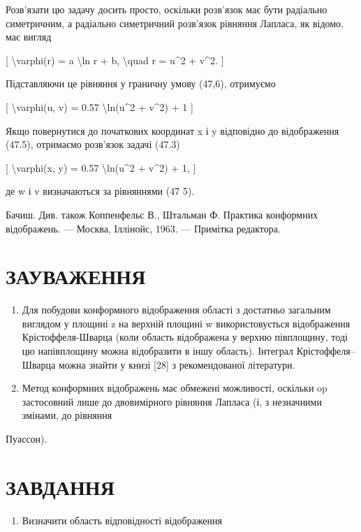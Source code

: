 \documentclass[
]{article}
\providecommand{\tightlist}{%
  \setlength{\itemsep}{0pt}\setlength{\parskip}{0pt}}
\begin{document}
{Розв'язати цю задачу досить просто, оскільки розв'язок має бути
радіально симетричним, а радіально симетричний розв'язок рівняння
Лапласа, як відомо, має вигляд

{[} \textbackslash varphi(r) = a \textbackslash ln r + b,
\textbackslash quad r = u\^{}2 + v\^{}2. {]}

Підставляючи це рівняння у граничну умову (47,6), отримуємо

{[} \textbackslash varphi(u, v) = 0.57 \textbackslash ln(u\^{}2 +
v\^{}2) + 1 {]}

Якщо повернутися до початкових координат x і y відповідно до
відображення (47.5), отримаємо розв'язок задачі (47.3)

{[} \textbackslash varphi(x, y) = 0.57 \textbackslash ln(u\^{}2 +
v\^{}2) + 1, {]}

де w і v визначаються за рівняннями (47 5).

Бачиш. Див. також Коппенфельс В., Штальман Ф. Практика конформних
відображень. --- Москва, Іллінойс, 1963. --- Примітка редактора.

\section{ЗАУВАЖЕННЯ}\label{ux437ux430ux443ux432ux430ux436ux435ux43dux43dux44f-8}

\begin{enumerate}
\def\labelenumi{\arabic{enumi}.}
\item
  Для побудови конформного відображення області з достатньо загальним
  виглядом у площині z на верхній площині w використовується
  відображення Крістоффеля-Шварца (коли область відображена у верхню
  півплощину, тоді цю напівплощину можна відобразити в іншу область).
  Інтеграл Крістоффеля--Шварца можна знайти у книзі {[}28{]} з
  рекомендованої літератури.
\item
  Метод конформних відображень має обмежені можливості, оскільки op
  застосовний лише до двовимірного рівняння Лапласа (і, з незначними
  змінами, до рівняння
\end{enumerate}

Пуассон).

\section{ЗАВДАННЯ}\label{ux437ux430ux432ux434ux430ux43dux43dux44f-11}

\begin{enumerate}
\def\labelenumi{\arabic{enumi}.}
\tightlist
\item
  Визначити область відповідності відображення
\end{enumerate}

}
\end{document}
